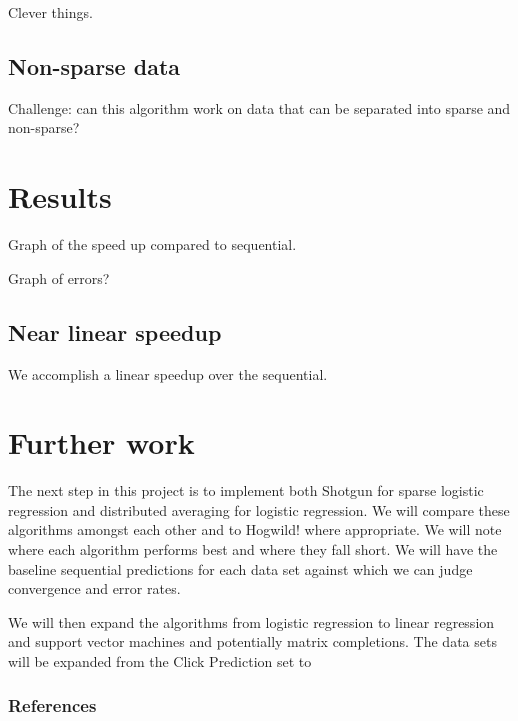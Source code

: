 \documentclass{article} %
\begin{document}
Clever things.

\subsection{Non-sparse data}
Challenge: can this algorithm work on data that can be separated into sparse and non-sparse?

\section{Results}
\label{headings}
Graph of the speed up compared to sequential.

Graph of errors?

\subsection{Near linear speedup}
We accomplish a linear speedup over the sequential.

\section{Further work}
The next step in this project is to implement both Shotgun for sparse logistic regression and distributed averaging for logistic regression. We will compare these algorithms amongst each other and to Hogwild! where appropriate. We will note where each algorithm performs best and where they fall short. We will have the baseline sequential predictions for each data set against which we can judge convergence and error rates.

We will then expand the algorithms from logistic regression to linear regression and support vector machines and potentially matrix completions. The data sets will be expanded from the Click Prediction set to 


\subsubsection*{References}

\begingroup
\renewcommand{\section}[2]{}%


\endgroup
\end{document}
